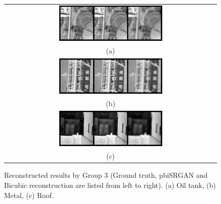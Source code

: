\documentclass[10pt,twocolumn,letterpaper]{article}
\begin{document}
\begin{figure}%
\centering\begin{tabular}{c}
\includegraphics[width=0.5\textwidth]{fig22-a}\\
(a)\\[3ex]%
\includegraphics[width=0.5\textwidth]{fig22-b}\\
(b)\\[3ex]
\includegraphics[width=0.5\textwidth]{fig22-c}\\
(c)
\end{tabular}
\caption{Reconstructed results by Group 3 (Ground truth, pbiSRGAN and Bicubic reconstruction are listed from left to right). (a) Oil tank, (b) Metal, (c) Roof.}%
\label{fig22}%
\end{figure}
\end{document}
